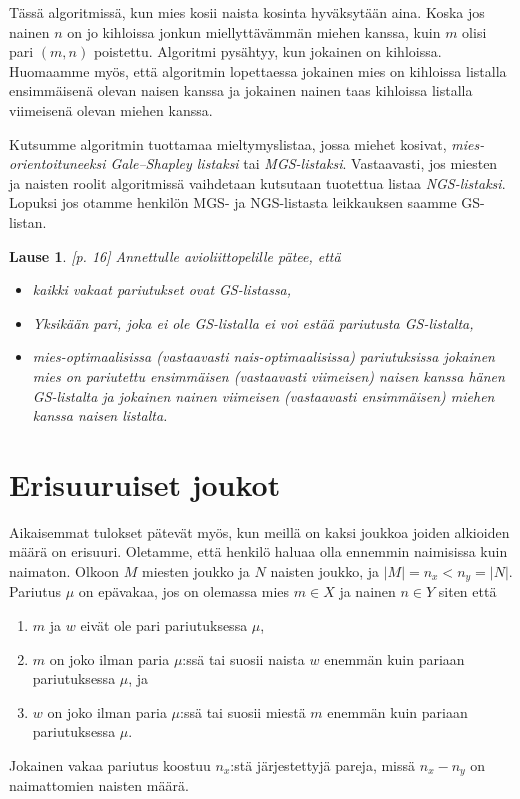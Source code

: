 \documentclass[finnish]{tktltiki2}
\newtheorem{lau}{Lause}
\theoremstyle{definition}
\theoremstyle{remark}
\begin{document}
Tässä algoritmissä, kun mies kosii naista kosinta hyväksytään aina. Koska jos nainen $n$ on jo kihloissa jonkun miellyttävämmän miehen kanssa, kuin $m$ olisi pari $(m, n)$ poistettu.
Algoritmi pysähtyy, kun jokainen on kihloissa. Huomaamme myös, että algoritmin lopettaessa jokainen mies on kihloissa listalla ensimmäisenä olevan naisen kanssa ja jokainen nainen taas kihloissa listalla viimeisenä olevan miehen kanssa.

Kutsumme algoritmin tuottamaa mieltymyslistaa, jossa miehet kosivat, \emph{mies-orientoituneeksi Gale--Shapley listaksi} tai \emph{MGS-listaksi}. Vastaavasti, jos miesten ja naisten roolit algoritmissä vaihdetaan kutsutaan tuotettua listaa \emph{NGS-listaksi}. Lopuksi jos otamme henkilön MGS- ja NGS-listasta leikkauksen saamme GS-listan.

\begin{lau}\cite{gusfield1989stable}[p. 16]
	Annettulle avioliittopelille pätee, että
	\begin{itemize}
		\item kaikki vakaat pariutukset ovat GS-listassa,
		\item Yksikään pari, joka ei ole GS-listalla ei voi estää pariutusta GS-listalta,
		\item mies-optimaalisissa (vastaavasti nais-optimaalisissa) pariutuksissa jokainen mies on pariutettu ensimmäisen (vastaavasti viimeisen) naisen kanssa hänen GS-listalta ja jokainen nainen viimeisen (vastaavasti ensimmäisen) miehen kanssa naisen listalta.
	\end{itemize}
\end{lau}


\section{Erisuuruiset joukot}
Aikaisemmat tulokset pätevät myös, kun meillä on kaksi joukkoa joiden alkioiden määrä on erisuuri. Oletamme, että henkilö haluaa olla ennemmin naimisissa kuin naimaton.
Olkoon $M$ miesten joukko ja $N$ naisten joukko, ja $|M| = n_x < n_y = |N|$. Pariutus $\mu$ on epävakaa, jos on olemassa mies $m \in X$ ja nainen $n \in Y$ siten että

\begin{enumerate}
	\item $m$ ja $w$ eivät ole pari pariutuksessa $\mu$,
	\item $m$ on joko ilman paria $\mu$:ssä tai suosii naista $w$ enemmän kuin pariaan pariutuksessa $\mu$, ja
	\item $w$ on joko ilman paria $\mu$:ssä tai suosii miestä $m$ enemmän kuin pariaan pariutuksessa $\mu$.
\end{enumerate}
Jokainen vakaa pariutus koostuu $n_x$:stä järjestettyjä pareja, missä $n_x - n_y$ on naimattomien naisten määrä.
\end{document}
